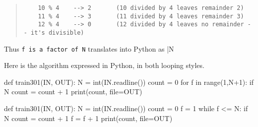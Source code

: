 \begin{quote}
  \begin{verbatim}
    10 % 4    --> 2       (10 divided by 4 leaves remainder 2)
    11 % 4    --> 3       (11 divided by 4 leaves remainder 3)
    12 % 4    --> 0       (12 divided by 4 leaves no remainder -- it's divisible)
  \end{verbatim}
\end{quote}

Thus \texttt{f is a factor of N} translates into Python as \pycode|N %

\Solution

Here is the algorithm expressed in Python, in both looping styles.


\begin{minipage}{\textwidth}
  \begin{pythoncode}
    def train301(IN, OUT):
      N = int(IN.readline())
      count = 0
      for f in range(1,N+1):
        if N %
          count = count + 1
      print(count, file=OUT)

    def train301(IN, OUT):
      N = int(IN.readline())
      count = 0
      f = 1
      while f <= N:
        if N %
          count = count + 1
        f = f + 1
      print(count, file=OUT)
  \end{pythoncode}
\end{minipage}
